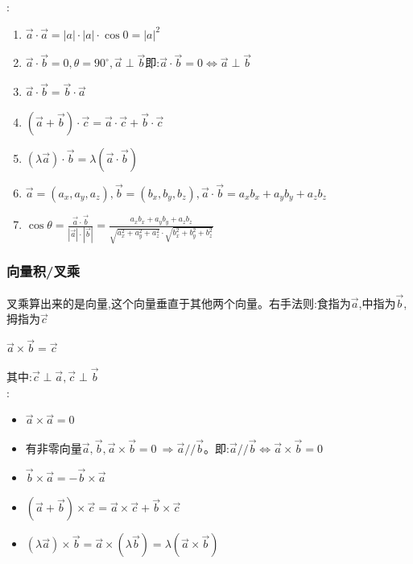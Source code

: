 \documentclass[UTF8]{ctexbook}
\newcommand{\degree}{^\circ}
\begin{document}
{{{{      :
      \begin{enumerate}
        \item $\vec{a}\cdot\vec{a} = |a|\cdot|a|\cdot\cos0 = |a|^2$
        \item $\vec{a}\cdot\vec{b} = 0,\theta = 90\degree,\vec{a} \perp \vec{b}$\qquad 即:$\vec{a}\cdot\vec{b} = 0 \Leftrightarrow \vec{a} \perp \vec{b}$
        \item $\vec{a}\cdot\vec{b} = \vec{b}\cdot\vec{a}$
        \item $(\vec{a}+\vec{b})\cdot\vec{c} = \vec{a}\cdot\vec{c} + \vec{b}\cdot\vec{c}$
        \item $(\lambda\vec{a})\cdot\vec{b} = \lambda(\vec{a}\cdot\vec{b})$
        \item $\vec{a} = (a_x,a_y,a_z),\vec{b} = (b_x,b_y,b_z),\vec{a}\cdot\vec{b} = a_xb_x + a_yb_y + a_zb_z$
        \item $\cos\theta = \frac{\vec{a}\cdot\vec{b}}{|\vec{a}|\cdot|\vec{b}|} = \frac{a_xb_x + a_yb_y + a_zb_z}{\sqrt{a_x^2 + a_y^2 + a_z^2}\cdot\sqrt{b_x^2 + b_y^2 + b_z^2}}$
      \end{enumerate}

    }%

    \subsubsection{向量积/叉乘}{
      叉乘算出来的是向量,这个向量垂直于其他两个向量。右手法则:食指为$\vec{a}$,中指为$\vec{b}$,拇指为$\vec{c}$

      $\vec{a}\times\vec{b} = \vec{c}$

      其中:$\vec{c}\perp\vec{a},\vec{c}\perp\vec{b}$\\

      :
      \begin{itemize}
        \item $\vec{a}\times\vec{a} = 0$
        \item 有非零向量$\vec{a},\vec{b},\vec{a}\times\vec{b} = 0\ \Rightarrow \vec{a} // \vec{b}$。即:$\vec{a} // \vec{b} \Leftrightarrow \vec{a} \times \vec{b} = 0$
        \item $\vec{b}\times\vec{a} = -\vec{b}\times\vec{a}$
        \item $(\vec{a} + \vec{b})\times\vec{c} = \vec{a} \times \vec{c} + \vec{b} \times \vec{c}$
        \item $(\lambda\vec{a})\times\vec{b} = \vec{a} \times (\lambda\vec{b}) = \lambda(\vec{a}\times\vec{b})$
      \end{itemize}

}}}}
\end{document}
